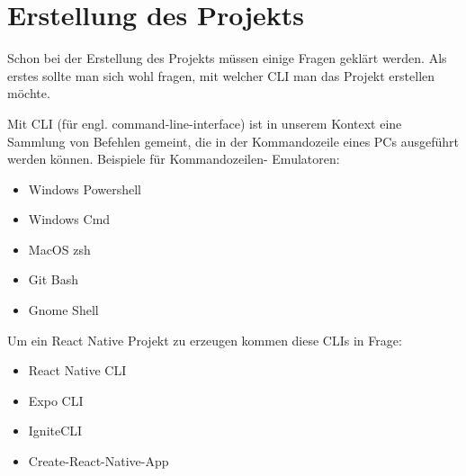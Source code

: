\chapter{Erstellung des Projekts}
Schon bei der Erstellung des Projekts müssen einige Fragen geklärt werden. Als erstes sollte man
sich wohl fragen, mit welcher CLI man das Projekt erstellen möchte.

Mit CLI (für engl. command-line-interface) ist in unserem Kontext eine Sammlung von Befehlen
gemeint, die in der Kommandozeile eines PCs ausgeführt werden können. Beispiele für Kommandozeilen-
Emulatoren:

\begin{itemize}
  \item Windows Powershell
  \item Windows Cmd
  \item MacOS zsh
  \item Git Bash
  \item Gnome Shell
\end{itemize}

Um ein React Native Projekt zu erzeugen kommen diese CLIs in Frage:
\begin{itemize}
  \item React Native CLI
  \item Expo CLI
  \item IgniteCLI \cite{ignitecli}
  \item Create-React-Native-App \cite{createReactNativeApp}
\end{itemize}

\newpage

\newpage

\newpage